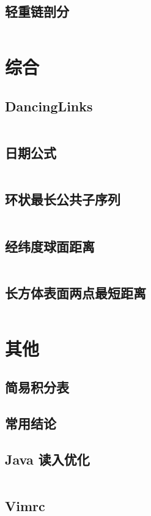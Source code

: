 \documentclass[titlepage,landscape,a4paper,10pt]{article}
\begin{document}
\begin{multicols}{2}
\begin{spacing}{0.8}
\subsection{轻重链剖分}
\inputminted{cpp}{src/轻重链剖分.cpp}

\section{综合}

\subsection{DancingLinks}
\inputminted{cpp}{src/DancingLinks.cpp}

\subsection{日期公式}
\inputminted{cpp}{improve/日期公式.cpp}

\subsection{环状最长公共子序列}
\inputminted{cpp}{improve/CycleLongest.cpp}

\subsection{经纬度球面距离}
\inputminted{cpp}{src/经纬度求球面最短距离.cpp}

\subsection{长方体表面两点最短距离}
\inputminted{cpp}{src/长方体表面两点最短距离.cpp}

\section{其他}

\subsection{简易积分表}


\subsection{常用结论}


\subsection{Java 读入优化}
\inputminted{java}{src/Main.java}

\subsection{Vimrc}
\inputminted{text}{src/vimrc.vim}

\end{spacing}
\end{multicols}

\newpage

\end{document}
